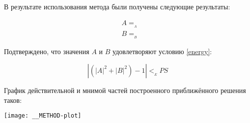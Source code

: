 В результате использования метода были получены следующие результаты:

\begin{equation}\label{__METHOD-results}
  \begin{aligned}
    &A=__A \\
    &B=__B
  \end{aligned}
\end{equation}

Подтверждено, что значения $A$ и $B$ удовлетворяют условию \ref{energy}:

\begin{displaymath}
  \left | \left( |A|^2 + |B|^2 \right) - 1 \right | < __EPS
\end{displaymath}

График действительной и мнимой частей построенного приближённого
решения таков:

\texttt{[image: \_\_METHOD-plot]}